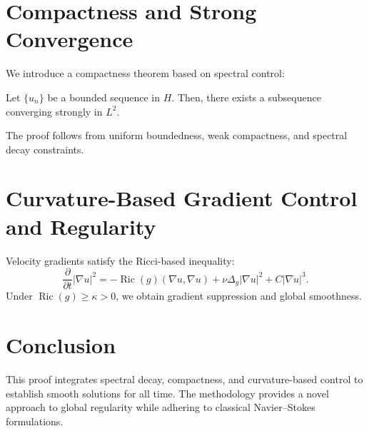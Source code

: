 \section{Compactness and Strong Convergence}
We introduce a compactness theorem based on spectral control:
\begin{theorem}
Let $\{u_n\}$ be a bounded sequence in $H$. Then, there exists a subsequence converging strongly in $L^2$.
\end{theorem}
The proof follows from uniform boundedness, weak compactness, and spectral decay constraints.

\section{Curvature-Based Gradient Control and Regularity}
Velocity gradients satisfy the Ricci-based inequality:
\begin{equation}
\frac{\partial}{\partial t} |\nabla u|^2 = -\operatorname{Ric}(g)(\nabla u, \nabla u) + \nu \Delta_g |\nabla u|^2 + C |\nabla u|^3.
\end{equation}
Under $\operatorname{Ric}(g) \geq \kappa > 0$, we obtain gradient suppression and global smoothness.

\section{Conclusion}
This proof integrates spectral decay, compactness, and curvature-based control to establish smooth solutions for all time. The methodology provides a novel approach to global regularity while adhering to classical Navier--Stokes formulations.





